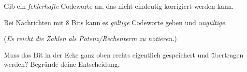 \documentclass[10pt, a4paper]{scrartcl}
\begin{document}
\begin{aufgabe}
	Gib ein \emph{fehlerhafte} Codeworte an, das nicht eindeutig korrigiert werden kann.
	
	\begin{center}
	\end{center}
\end{aufgabe}

\begin{aufgabe}
	Bei Nachrichten mit 8 Bits kann es \luecke{2cm} \emph{gültige} Codeworte geben und \luecke{2cm} \emph{ungültige}.
	
	(\emph{Es reicht die Zahlen als Potenz/Rechenterm zu notieren.})
\end{aufgabe}

\begin{aufgabe}
	Muss das Bit in der Ecke ganz oben rechts eigentlich gespeichert und übertragen werden? Begründe deine Entscheidung.
\end{aufgabe}
\end{document}
